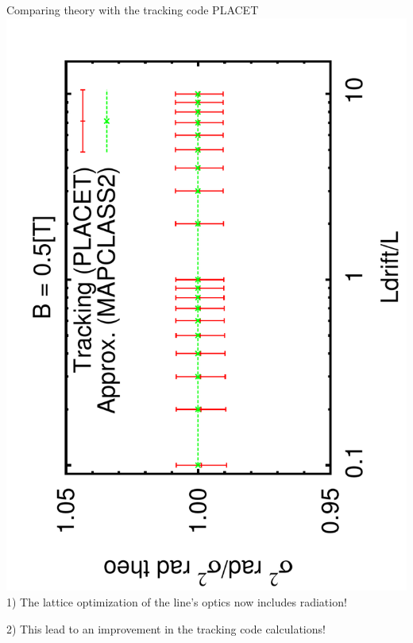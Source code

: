\documentclass{beamer}
\begin{document}
\begin{frame}{Comparing theory with the tracking code PLACET}
 \includegraphics[scale=0.24,angle=-90]{sigma_Ldrift_r6.pdf}\\
 \centering\vspace*{1cm}
 1) The lattice optimization of the line's optics now includes radiation!\par
 2) This lead to an improvement in the tracking code calculations!\par
\end{frame}

\newcommand{\twisslogo}{
  \setlength{\TPHorizModule}{1pt}
  \setlength{\TPVertModule}{1pt}
  \begin{textblock}{1}(200,80)
   Twiss
  \end{textblock}
  }
\end{document}
